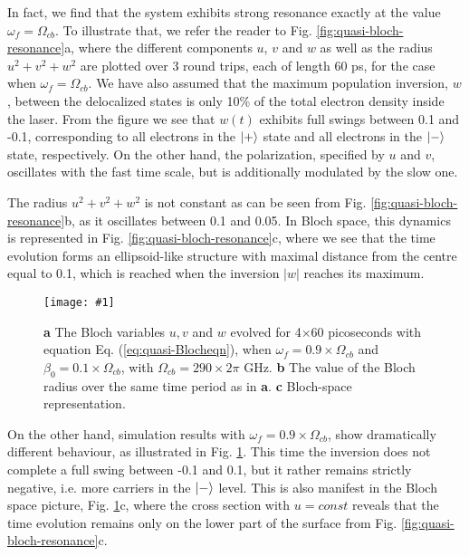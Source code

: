 \documentclass[]{spie}  %
\newcommand{\includegraphicsXL}[1]{\texttt{[image: \#1]}}
\begin{document}
In fact, we find that the system exhibits strong resonance exactly at the value $\omega_f = \Omega_{cb}$. To illustrate that, we refer the reader to Fig. \ref{fig:quasi-bloch-resonance}a, where the different components $u$, $v$ and $w$ as well as the radius $u^2+v^2+w^2$ are plotted over 3 round trips, each of length 60 ps, for the case when $\omega_f =  \Omega_{cb}$. We have also assumed that the maximum population inversion, $w$, between the delocalized states is only 10\% of the total electron density inside the laser. From the figure we see that $w(t)$ exhibits full swings between 0.1 and -0.1, corresponding to all electrons in the $\ket{+}$ state and all electrons in the $\ket{-}$ state, respectively. On the other hand, the polarization, specified by $u$ and $v$, oscillates with the fast time scale, but is additionally modulated by the slow one.


 The radius $u^2+v^2+w^2$ is not constant as can be seen from Fig. \ref{fig:quasi-bloch-resonance}b, as it oscillates between 0.1 and 0.05. In Bloch space, this dynamics is represented in Fig. \ref{fig:quasi-bloch-resonance}c, where we see that the time evolution forms an ellipsoid-like structure with maximal distance from the centre equal to 0.1, which is reached when the inversion $|w|$ reaches its maximum. 
 
\begin{figure}[h!] 
	\begin{center}
		\includegraphicsXL{IMGS/quasi-bloch_off-resonance.eps}
		\caption{ \textbf{a} The Bloch variables $u,v$ and $w$ evolved for 4$\times$60 picoseconds with equation Eq. (\ref{eq:quasi-Blocheqn}), when $\omega_f = 0.9\times\Omega_{cb}$ and $\beta_0 = 0.1\times\Omega_{cb}$, with $\Omega_{cb} = 290\times 2\pi$ GHz. \textbf{b} The value of the Bloch radius over the same time period as in \textbf{a}. \textbf{c} Bloch-space representation. } \label{fig:quasi-bloch_off-resonance}
	\end{center}	
\end{figure}

On the other hand, simulation results with  $\omega_f = 0.9\times\Omega_{cb}$, show dramatically different behaviour, as illustrated in Fig. \ref{fig:quasi-bloch_off-resonance}. This time the inversion does not complete a full swing between -0.1 and 0.1, but it rather remains strictly negative, i.e. more carriers in the $\ket{-}$ level. This is also manifest in the Bloch space picture, Fig. \ref{fig:quasi-bloch_off-resonance}c, where the cross section with $u=const$ reveals that the time evolution remains only on the lower part of the surface from Fig. \ref{fig:quasi-bloch-resonance}c. 
\end{document}
